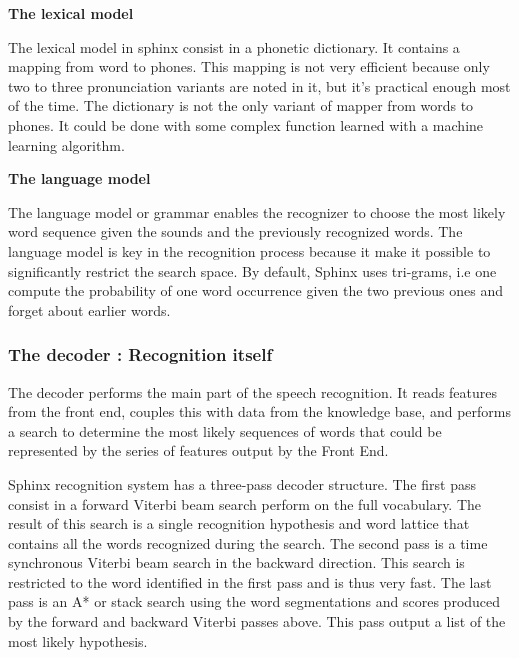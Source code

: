 \textbf{The lexical model}

The lexical model in sphinx consist in a phonetic dictionary. It contains a mapping from word to phones. This mapping is not very efficient because only two to three pronunciation variants are noted in it, but it's practical enough most of the time. The dictionary is not the only variant of mapper from words to phones. It could be done with some complex function learned with a machine learning algorithm. 

\textbf{The language model}
 
The language model or grammar enables the recognizer to choose the most likely word sequence given the sounds and the previously recognized words. The language model is key in the recognition process because it make it possible to significantly restrict the search space. By default, Sphinx uses tri-grams, i.e one compute the probability of one word occurrence given the two previous ones and forget about earlier words.  

\subsubsection*{The decoder : Recognition itself}
The decoder performs the main part of the speech recognition. It reads features from the front 
end, couples this with data from the knowledge base, and performs a search to determine the most likely sequences of words that could be represented by the series of features output by the Front End.

Sphinx recognition system has a three-pass decoder structure. The first pass consist in a forward Viterbi beam search perform on the full vocabulary. The result of this search is a single recognition hypothesis and word lattice that contains all the words recognized during the search. The second pass is a time synchronous Viterbi beam search in the backward direction. This search is restricted to the word identified in the first pass and is thus very fast. The last pass is an A* or stack search using the word segmentations and scores produced by the
forward and backward Viterbi passes above. This pass output a list of the most likely hypothesis.